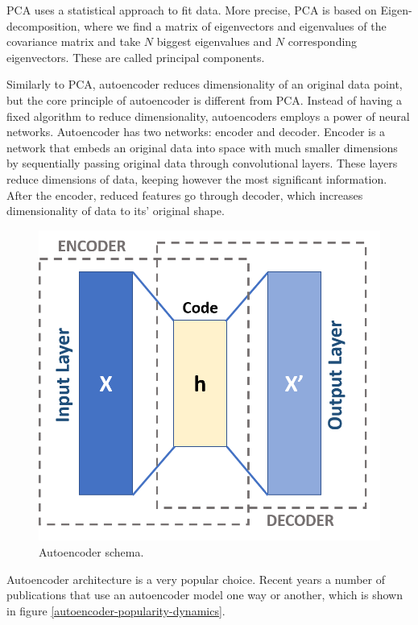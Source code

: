 PCA uses a statistical approach to fit data. More precise, PCA is based on Eigen-decomposition, where we find a matrix of eigenvectors and eigenvalues of the covariance matrix and take $N$ biggest eigenvalues and $N$ corresponding eigenvectors. These are called principal components.

Similarly to PCA, autoencoder reduces dimensionality of an original data point, but the core principle of autoencoder is different from PCA. Instead of having a fixed algorithm to reduce dimensionality, autoencoders employs a power of neural networks. Autoencoder has two networks: encoder and decoder. Encoder is a network that embeds an original data into space with much smaller dimensions by sequentially passing original data through convolutional layers. These layers reduce dimensions of data, keeping however the most significant information. After the encoder, reduced features go through decoder, which increases dimensionality of data to its' original shape.

\begin{figure}[!ht]
    \centering
    \includegraphics[width=\textwidth]{figure/Autoencoder_schema.png}
    \caption{Autoencoder schema.}
    \label{autoencoder-schema}
\end{figure}

Autoencoder architecture is a very popular choice. Recent years a number of publications that use an autoencoder model one way or another, which is shown in figure \ref{autoencoder-popularity-dynamics}.

